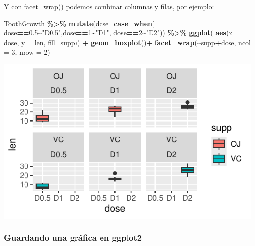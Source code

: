 \documentclass[
]{book}
\newenvironment{Shaded}{\begin{snugshade}}{\end{snugshade}}
\newcommand{\AttributeTok}[1]{\textcolor[rgb]{0.13,0.29,0.53}{#1}}
\newcommand{\DecValTok}[1]{\textcolor[rgb]{0.00,0.00,0.81}{#1}}
\newcommand{\FloatTok}[1]{\textcolor[rgb]{0.00,0.00,0.81}{#1}}
\newcommand{\FunctionTok}[1]{\textcolor[rgb]{0.13,0.29,0.53}{\textbf{#1}}}
\newcommand{\NormalTok}[1]{#1}
\newcommand{\SpecialCharTok}[1]{\textcolor[rgb]{0.81,0.36,0.00}{\textbf{#1}}}
\newcommand{\StringTok}[1]{\textcolor[rgb]{0.31,0.60,0.02}{#1}}
\begin{document}
\newpage

Y con facet\_wrap() podemos combinar columnas y filas, por ejemplo:\\

\begin{Shaded}
\begin{Highlighting}[]
\NormalTok{ToothGrowth }\SpecialCharTok{\%\textgreater{}\%}  \FunctionTok{mutate}\NormalTok{(}\AttributeTok{dose=}\FunctionTok{case\_when}\NormalTok{(}
\NormalTok{  dose}\SpecialCharTok{==}\FloatTok{0.5}\SpecialCharTok{\textasciitilde{}}\StringTok{"D0.5"}\NormalTok{,dose}\SpecialCharTok{==}\DecValTok{1}\SpecialCharTok{\textasciitilde{}}\StringTok{"D1"}\NormalTok{, dose}\SpecialCharTok{==}\DecValTok{2}\SpecialCharTok{\textasciitilde{}}\StringTok{"D2"}\NormalTok{)) }\SpecialCharTok{\%\textgreater{}\%} \FunctionTok{ggplot}\NormalTok{(}
    \FunctionTok{aes}\NormalTok{(}\AttributeTok{x =}\NormalTok{ dose, }\AttributeTok{y =}\NormalTok{ len, }\AttributeTok{fill=}\NormalTok{supp)) }\SpecialCharTok{+}  \FunctionTok{geom\_boxplot}\NormalTok{()}\SpecialCharTok{+} 
  \FunctionTok{facet\_wrap}\NormalTok{(}\SpecialCharTok{\textasciitilde{}}\NormalTok{supp}\SpecialCharTok{+}\NormalTok{dose, }\AttributeTok{ncol =} \DecValTok{3}\NormalTok{, }\AttributeTok{nrow =} \DecValTok{2}\NormalTok{)}
\end{Highlighting}
\end{Shaded}

\begin{center}\includegraphics{_main_files/figure-latex/unnamed-chunk-222-1} \end{center}

\subsubsection{Guardando una gráfica en ggplot2}\label{guardando-una-gruxe1fica-en-ggplot2}
\end{document}

